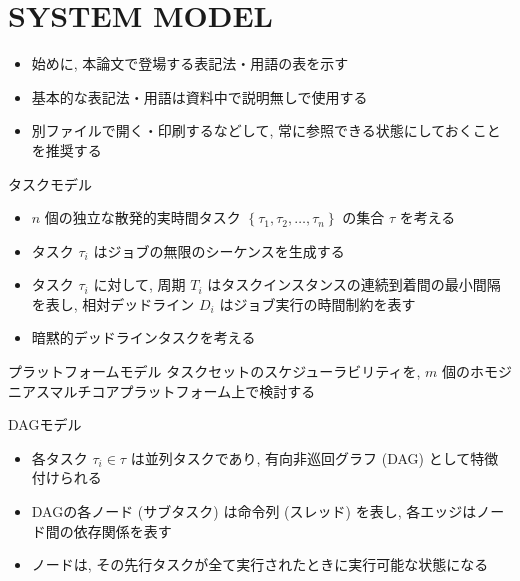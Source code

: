 
\section{SYSTEM MODEL}
\label{sec: system model}

\begin{frame}{}
    \begin{itemize}
        \item 始めに, 本論文で登場する表記法・用語の表を示す
        \item 基本的な表記法・用語は資料中で説明無しで使用する
        \item 別ファイルで開く・印刷するなどして, 常に参照できる状態にしておくことを推奨する
    \end{itemize}
\end{frame}



\begin{frame}{タスクモデル}
    \begin{itemize}
        \item $n$ 個の独立な散発的実時間タスク $\left\{\tau_{1}, \tau_{2}, \ldots, \tau_{n}\right\}$ の集合 $\tau$ を考える
        \item タスク $\tau_{i}$ はジョブの無限のシーケンスを生成する
        \item タスク $\tau_{i}$ に対して, 周期 $T_{i}$ はタスクインスタンスの連続到着間の最小間隔を表し, 相対デッドライン $D_{i}$ はジョブ実行の時間制約を表す
        \item 暗黙的デッドラインタスクを考える
    \end{itemize}
\end{frame}

\begin{frame}{プラットフォームモデル}
    タスクセットのスケジューラビリティを, $m$ 個のホモジニアスマルチコアプラットフォーム上で検討する
\end{frame}

\begin{frame}{DAGモデル}
    \begin{itemize}
        \item 各タスク $\tau_{i} \in \tau$ は並列タスクであり, 有向非巡回グラフ (DAG) として特徴付けられる
        \item DAGの各ノード (サブタスク) は命令列 (スレッド) を表し, 各エッジはノード間の依存関係を表す
        \item ノードは, その先行タスクが全て実行されたときに実行可能な状態になる
    \end{itemize}
\end{frame}

